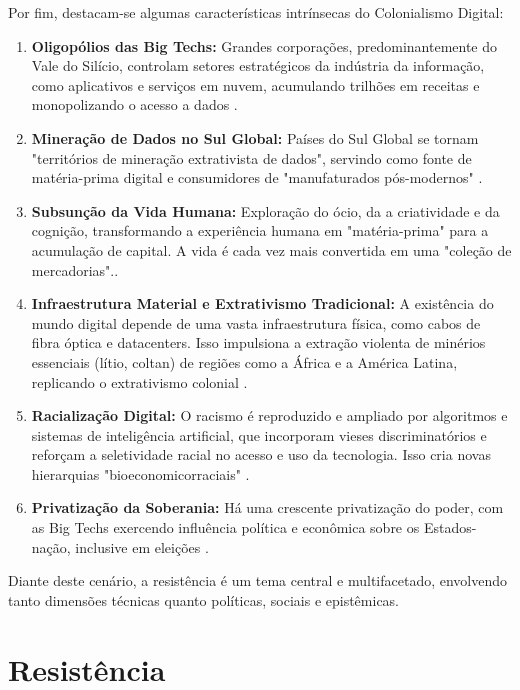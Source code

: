 Por fim, destacam-se algumas características intrínsecas do Colonialismo Digital: 

\begin{enumerate}
    \item \textbf{Oligopólios das Big Techs:} Grandes corporações, predominantemente do Vale do Silício, controlam setores estratégicos da indústria da informação, como aplicativos e serviços em nuvem, acumulando trilhões em receitas e monopolizando o acesso a dados \cite{Faustino2023, Silva2023, furtado2024, couldry2018, Zuboff2019}.
    \item \textbf{Mineração de Dados no Sul Global:} Países do Sul Global se tornam "territórios de mineração extrativista de dados", servindo como fonte de matéria-prima digital e consumidores de "manufaturados pós-modernos" \cite{Faustino2023, furtado2024, Silveira2021, Silva2023}.
    \item \textbf{Subsunção da Vida Humana:} Exploração do ócio, da a criatividade e da cognição, transformando a experiência humana em "matéria-prima" para a acumulação de capital. A vida é cada vez mais convertida em uma "coleção de mercadorias"\cite{Faustino2023, couldry2018, Silveira2021, Zuboff2019}..
    \item \textbf{Infraestrutura Material e Extrativismo Tradicional:} A existência do mundo digital depende de uma vasta infraestrutura física, como cabos de fibra óptica e datacenters. Isso impulsiona a extração violenta de minérios essenciais (lítio, coltan) de regiões como a África e a América Latina, replicando o extrativismo colonial \cite{Faustino2023, Figueiredo2023}.
    \item \textbf{Racialização Digital:} O racismo é reproduzido e ampliado por algoritmos e sistemas de inteligência artificial, que incorporam vieses discriminatórios e reforçam a seletividade racial no acesso e uso da tecnologia. Isso cria novas hierarquias "bioeconomicorraciais" \cite{Faustino2023}.
    \item \textbf{Privatização da Soberania:} Há uma crescente privatização do poder, com as Big Techs exercendo influência política e econômica sobre os Estados-nação, inclusive em eleições \cite{Faustino2023}.
\end{enumerate}

Diante deste cenário, a resistência é um tema central e multifacetado, envolvendo tanto dimensões técnicas quanto políticas, sociais e epistêmicas.

\section{Resistência}
\label{sec:resitencie}

